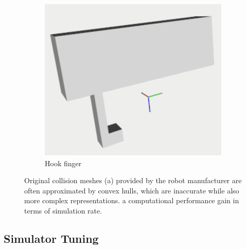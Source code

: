 \begin{figure}[t]
\begin{subfigure}{0.3\columnwidth}
\end{subfigure}%
\hfill
\begin{subfigure}{0.3\columnwidth}
    \includegraphics[width=\linewidth]{figures/single_hook_cropped.pdf}
    \caption{Hook finger}\label{fig:hook_finger}
\end{subfigure}

\caption{Original collision meshes (a) provided by the robot manufacturer are often approximated by convex hulls, which are inaccurate while also more complex representations.  a computational performance gain in terms of simulation rate.\label{fig:1}}

\end{figure}

\subsection{Simulator Tuning}
